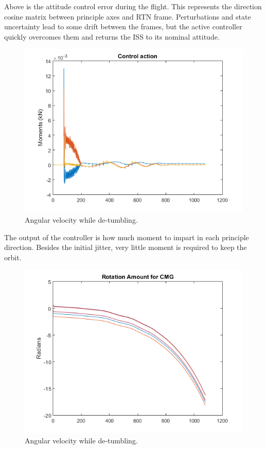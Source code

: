 \documentclass[12pt, letterpaper]{article}
\begin{document}
Above is the attitude control error during the flight. This represents the direction cosine matrix between principle axes and RTN frame. Perturbations and state uncertainty lead to some drift between the frames, but the active controller quickly overcomes them and returns the ISS to its nominal attitude.

\begin{figure}[H]
	\centering
	\includegraphics[scale=0.9]{ps8_04}
	\caption{Angular velocity while de-tumbling.}
	\label{8:angvel}
\end{figure}

The output of the controller is how much moment to impart in each principle direction. Besides the initial jitter, very little moment is required to keep the orbit.

\begin{figure}[H]
	\centering
	\includegraphics[scale=0.9]{ps8_05}
	\caption{Angular velocity while de-tumbling.}
	\label{8:angvel}
\end{figure}
\end{document}
